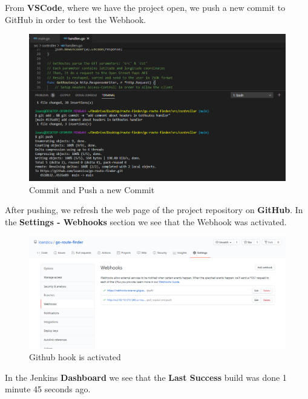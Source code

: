 \documentclass[12pt,a4paper,twoside]{article}
\begin{document}
From \textbf{VSCode}, where we have the project open, we push a new commit to GitHub in order to test the Webhook.


\begin{figure}[H]
    \centering
        \includegraphics[width=15cm]{images-aws/47-small-commit-after-fixed-branches.png}
        \caption{Commit and Push a new Commit}
\end{figure}


After pushing, we refresh the web page of the project repository on \textbf{GitHub}. In the \textbf{Settings - Webhooks} section we see that the Webhook was activated.


\begin{figure}[H]
    \centering
        \includegraphics[width=15cm]{images-aws/48-successfull-push-webhook.png}
        \caption{Github hook is activated}
\end{figure}


In the Jenkins \textbf{Dashboard} we see that the \textbf{Last Success} build was done 1 minute 45 seconds ago.
\end{document}
